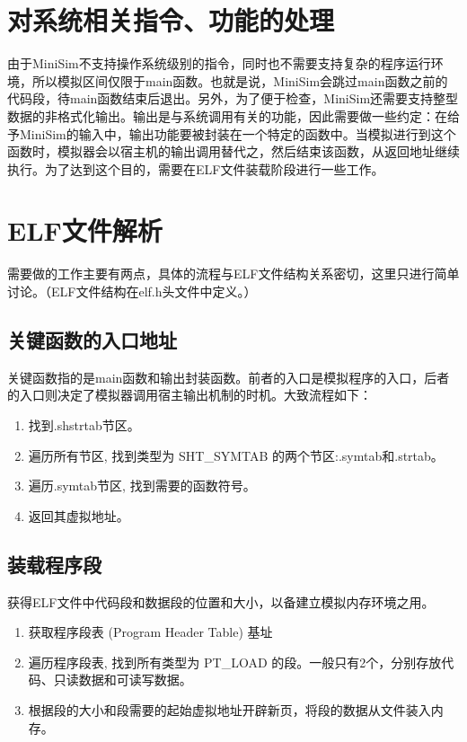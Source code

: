 \documentclass[12pt,a4paper,Flow]{report}
\begin{document}
\section{对系统相关指令、功能的处理}
由于MiniSim不支持操作系统级别的指令，同时也不需要支持复杂的程序运行环境，所以模拟区间仅限于main函数。也就是说，MiniSim会跳过main函数之前的代码段，待main函数结束后退出。另外，为了便于检查，MiniSim还需要支持整型数据的非格式化输出。输出是与系统调用有关的功能，因此需要做一些约定：在给予MiniSim的输入中，输出功能要被封装在一个特定的函数中。当模拟进行到这个函数时，模拟器会以宿主机的输出调用替代之，然后结束该函数，从返回地址继续执行。为了达到这个目的，需要在ELF文件装载阶段进行一些工作。
\section{ELF文件解析}
需要做的工作主要有两点，具体的流程与ELF文件结构关系密切，这里只进行简单讨论。（ELF文件结构在elf.h头文件中定义。）
\subsection{关键函数的入口地址}
关键函数指的是main函数和输出封装函数。前者的入口是模拟程序的入口，后者的入口则决定了模拟器调用宿主输出机制的时机。大致流程如下：
\begin{enumerate}
\item 找到.shstrtab节区。
\item 遍历所有节区, 找到类型为 SHT\_SYMTAB 的两个节区:.symtab和.strtab。
\item 遍历.symtab节区, 找到需要的函数符号。
\item 返回其虚拟地址。
\end{enumerate}
\subsection{装载程序段}
获得ELF文件中代码段和数据段的位置和大小，以备建立模拟内存环境之用。
\begin{enumerate}
\item 获取程序段表 (Program Header Table) 基址
\item 遍历程序段表, 找到所有类型为 PT\_LOAD 的段。一般只有2个，分别存放代码、只读数据和可读写数据。
\item 根据段的大小和段需要的起始虚拟地址开辟新页，将段的数据从文件装入内存。
\end{enumerate}
\end{document}
